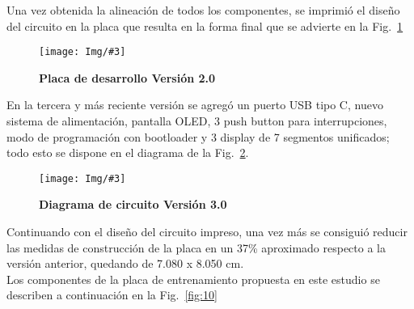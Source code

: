 \documentclass[times, 10pt,twocolumn]{article}
\newcommand{\Img}[5]{
   \begin{figure}[H]
   	   \centering
       \texttt{[image: Img/\#3]}
       \caption{ \centering \textbf{\small #4}}
       \label{#5}
       \end{figure}
   }
\begin{document}
Una vez obtenida la alineación de todos los componentes, se imprimió el diseño del circuito en la placa que resulta en la forma final que se advierte en la Fig.~\ref{fig:8}
\Img{7.5cm}{7.0cm}{segunda_version_final}{Placa de desarrollo Versión 2.0}{fig:8}


En la tercera y más reciente versión se agregó un puerto USB tipo C, nuevo sistema de alimentación, pantalla OLED, 3 push button para interrupciones, modo de programación con bootloader y 3 display de 7 segmentos unificados; todo esto se dispone en el diagrama de la Fig.~\ref{fig:9}.
\Img{8.5cm}{7.0cm}{Tercera_Version}{Diagrama de circuito Versión 3.0}{fig:9}

Continuando con el diseño del circuito impreso, una vez más se consiguió reducir las medidas de construcción de la placa en un 37\% aproximado respecto a la versión anterior, quedando de 7.080 x 8.050 cm. \\ 
Los componentes de la placa de entrenamiento propuesta en este estudio se describen a continuación en la Fig.~\ref{fig:10}
\end{document}
